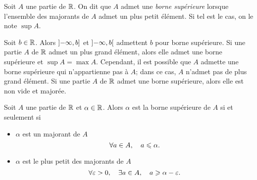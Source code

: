 \documentclass{magnolia}
\begin{document}

\begin{definition}[utile=-3]
Soit $A$ une partie de $\mathbb{R}$. On dit que $A$ admet une \emph{borne supérieure} lorsque
l'ensemble des majorants de $A$ admet un plus petit élément. Si tel est le cas,
on le note $\sup A$.
\end{definition}

\begin{remarques}
\remarque Soit $b\in\mathbb{R}$. Alors $\left]-\infty,b\right]$ et $\left]-\infty,b\right[$
  admettent $b$ pour borne supérieure.
\remarque Si une partie $A$ de $\mathbb{R}$ admet un plus grand élément, alors elle
  admet une borne supérieure et $\sup A = \max A$. Cependant, il est possible
  que $A$ admette une borne supérieure qui n'appartienne pas à $A$; dans ce cas,
  $A$ n'admet pas de plus grand élément.
\remarque Si une partie $A$ de $\mathbb{R}$ admet une borne supérieure, alors elle est
  non vide et majorée.
\end{remarques}

\begin{proposition}
  Soit $A$ une partie de $\mathbb{R}$ et $\alpha\in\mathbb{R}$. Alors $\alpha$ est la borne supérieure
  de $A$ si et seulement si
  \begin{itemize}
  \item $\alpha$ est un majorant de $A$
    \[\forall a\in A ,\quad a\leqslant\alpha.\]
  \item $\alpha$ est le plus petit des majorants de $A$
    \[\forall \varepsilon>0 ,\quad \exists a\in A ,\quad a\geqslant \alpha-\varepsilon.\]
  \end{itemize}
  \end{proposition}
  
\end{document}
